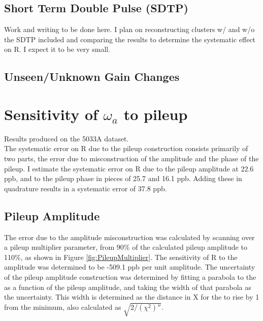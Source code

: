 	\subsection{Short Term Double Pulse (SDTP)}

		Work and writing to be done here. I plan on reconstructing clusters w/ and w/o the SDTP included and comparing the results to determine the systematic effect on R. I expect it to be very small.

	\subsection{Unseen/Unknown Gain Changes}



\section{Sensitivity of \texorpdfstring{$\omega_{a}$}{} to pileup}
\label{Sec:SystematicPileup}

	Results produced on the 5033A dataset. \\

	The systematic error on R due to the pileup construction consists primarily of two parts, the error due to misconstruction of the amplitude and the phase of the pileup. I estimate the systematic error on R due to the pileup amplitude at 22.6 ppb, and to the pileup phase in pieces of 25.7 and 16.1 ppb. Adding these in quadrature results in a systematic error of 37.8 ppb.

	\subsection{Pileup Amplitude}

		The error due to the amplitude misconstruction was calculated by scanning over a pileup multiplier parameter, from 90\% of the calculated pileup amplitude to 110\%, as shown in Figure \ref{fig:PileupMultiplier}. The sensitivity of R to the amplitude was determined to be -509.1 ppb per unit amplitude. The uncertainty of the pileup amplitude construction was determined by fitting a parabola to the \chisq as a function of the pileup amplitude, and taking the width of that parabola as the uncertainty. This width is determined as the distance in X for the \chisq to rise by 1 from the minimum, also calculated as $\sqrt{2/(\chi^{2})''}$.

